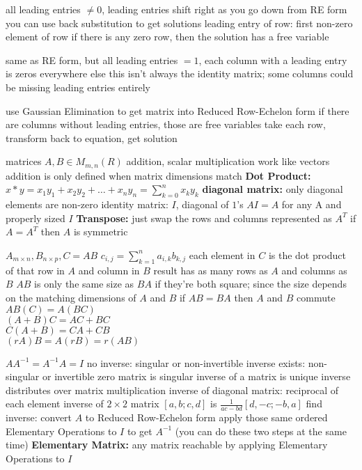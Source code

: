 \documentclass[12pt]{article}
\begin{document}
\begin{multicols*}{2}
\begin{flushleft}
\begin{outline}[longenum]
  \1 all leading entries $\not= 0$, leading entries shift right as you go down
  \1 from RE form you can use back substitution to get solutions
  \1 leading entry of row: first non-zero element of row
  \1 if there is any zero row, then the solution has a free variable

  \1 same as RE form, but all leading entries $=1$, each column with a leading entry is zeros everywhere else
    \2 this isn't always the identity matrix; some columns could be missing leading entries entirely

  \1 use Gaussian Elimination to get matrix into Reduced Row-Echelon form
  \1 if there are columns without leading entries, those are free variables
  \1 take each row, transform back to equation, get solution

  \1 matrices $A,B \in M_{m,n}(R)$
  \1 addition, scalar multiplication work like vectors
    \2 addition is only defined when matrix dimensions match
  \1 \textbf{Dot Product:} $x*y = x_1y_1 + x_2y_2 + \ldots + x_ny_n = \sum_{k=0}^{n}x_ky_k$
  \1 \textbf{diagonal matrix:} only diagonal elements are non-zero
  \1 identity matrix: $I$, diagonal of $1$'s
    \2 $AI=A$ for any A and properly sized $I$
  \1 \textbf{Transpose:} just swap the rows and columns
    \2 represented as $A^T$
    \2 if $A=A^T$ then $A$ is symmetric

 $A_{m \times n}, B_{n \times p}, C=AB$
  \1 $c_{i,j} = \sum_{k=1}^{n} a_{i,k}b_{k,j}$
  \1 each element in $C$ is the dot product of that row in $A$ and column in $B$
  \1 result has as many rows as $A$ and columns as $B$
  \1 $AB$ is only the same size as $BA$ if they're both square; since the size depends on the matching dimensions of $A$ and $B$
  \1 if $AB=BA$ then $A$ and $B$ commute
  \1 $AB(C) = A(BC)$
  \\ $(A+B)C = AC+BC$
  \\ $C(A+B) = CA+CB$
  \\ $(rA)B = A(rB) = r(AB)$

  \1 $AA^{-1} = A^{-1}A = I$
  \1 no inverse: singular or non-invertible
  \1 inverse exists: non-singular or invertible
  \1 zero matrix is singular
  \1 inverse of a matrix is unique
  \1 inverse distributes over matrix multiplication
  \1 inverse of diagonal matrix: reciprocal of each element
  \1 inverse of $2\times 2$ matrix $[a,b;c,d]$ is $\frac{1}{ac-bd}[d,-c;-b,a]$
  \1 find inverse:
    \2 convert $A$ to Reduced Row-Echelon form
    \2 apply those same ordered Elementary Operations to $I$ to get $A^{-1}$
    \2 (you can do these two steps at the same time)
  \1 \textbf{Elementary Matrix:} any matrix reachable by applying Elementary Operations to $I$


\end{outline}
\end{flushleft}
\end{multicols*}
\end{document}
